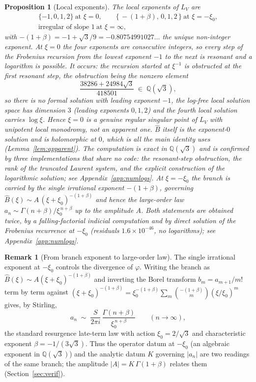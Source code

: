 \documentclass[11pt,reqno]{amsart}
\renewcommand{\_}{\vquadorigunderscore\allowbreak}
\theoremstyle{plain}
\newtheorem{proposition}[theorem]{Proposition}
\theoremstyle{definition}
\newtheorem{remark}[theorem]{Remark}
\newcommand{\Bhat}{\widehat{B}}
\newcommand{\LV}{L_{V}}
\newcommand{\Qsqrt}{\mathbb{Q}(\sqrt3)}
\newcommand{\xizero}{\xi_0}
\begin{document}
\begin{proposition}[Local exponents]\label{prop:exponents}
The local exponents of $\LV$ are
\[
\begin{gathered}
  \{-1,0,1,2\}\ \text{at } \xi=0,\qquad
  \{\,-(1+\beta),\,0,1,2\,\}\ \text{at } \xi=-\xizero,\\
  \text{irregular of slope }1\ \text{at } \xi=\infty,
\end{gathered}
\]
with $-(1+\beta)=-1+\sqrt3/9=-0.80754991027\ldots$ the unique non-integer exponent. At $\xi=0$
the four exponents are consecutive integers, so every step of the Frobenius recursion from the
lowest exponent $-1$ to the next is \emph{resonant} and a logarithm is possible. It occurs: the
recursion started at $\xi^{-1}$ is obstructed at the first resonant step, the obstruction being
the nonzero element
\[
  \frac{38286+24984\sqrt3}{418501}\;\in\;\Qsqrt ,
\]
so there is no formal solution with leading exponent $-1$, the log-free local solution space has
dimension $3$ (leading exponents $0,1,2$) and the fourth local solution carries $\log\xi$. Hence
$\xi=0$ is a genuine regular singular point of $\LV$ with unipotent local monodromy, \emph{not}
an apparent one. $\Bhat$ itself is the exponent-$0$ solution and is holomorphic at $0$, which is
all the main identity uses (Lemma~\ref{lem:apparent}). The computation is exact in $\Qsqrt$ and
is confirmed by three implementations that share no code: the resonant-step obstruction, the
rank of the truncated Laurent system, and the explicit construction of the logarithmic solution;
see Appendix~\ref{app:numlogs}. At $\xi=-\xizero$ the branch is carried by the
single irrational exponent $-(1+\beta)$, governing $\Bhat(\xi)\sim A\,(\xi+\xizero)^{-(1+\beta)}$
and hence the large-order law $a_n\sim \Gamma(n+\beta)/\xizero^{\,n+\beta}$ up to the amplitude
$A$. Both statements are obtained twice, by a falling-factorial indicial computation and by direct
solution of the Frobenius recurrence at $-\xizero$ (residuals $1.6\times10^{-46}$, no
logarithms); see Appendix~\ref{app:numlogs}.
\end{proposition}

\begin{remark}[From branch exponent to large-order law]\label{rmk:largeorder}
The single irrational exponent at $-\xizero$ controls the divergence of $\varphi$. Writing the
branch as $\Bhat(\xi)\sim A(\xi+\xizero)^{-(1+\beta)}$ and inverting the Borel transform
$b_m=a_{m+1}/m!$ term by term against $(\xi+\xizero)^{-(1+\beta)}=\xizero^{-(1+\beta)}\sum_m
\binom{-(1+\beta)}{m}(\xi/\xizero)^m$ gives, by Stirling,
\begin{equation}\label{eq:largeorder}
  a_n\;\sim\;\frac{S}{2\pi i}\,\frac{\Gamma(n+\beta)}{\xizero^{\,n+\beta}}\qquad(n\to\infty),
\end{equation}
the standard resurgence late-term law with action $\xizero=2/\sqrt3$ and characteristic exponent
$\beta=-1/(3\sqrt3)$. Thus the operator datum at $-\xizero$ (an algebraic exponent in $\Qsqrt$)
and the analytic datum $K$ governing $\lvert a_n\rvert$ are two readings of the same branch; the
amplitude $\lvert A\rvert=K\,\Gamma(1+\beta)$ relates them (Section~\ref{sec:verif}).
\end{remark}
\end{document}
